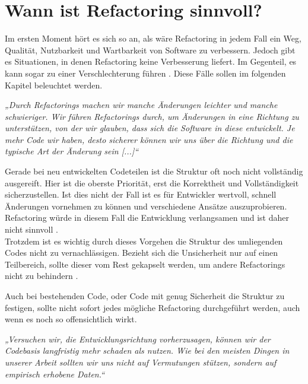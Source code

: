 \chapter{Wann ist Refactoring sinnvoll?}
Im ersten Moment hört es sich so an, als wäre Refactoring in jedem Fall ein Weg, Qualität, Nutzbarkeit und Wartbarkeit von Software zu verbessern.
Jedoch gibt es Situationen, in denen Refactoring keine Verbesserung liefert. Im Gegenteil, es kann sogar zu einer Verschlechterung führen \citep[S. 321 f.]{fiveLines.2023}.
Diese Fälle sollen im folgenden Kapitel beleuchtet werden.\\
\begin{singlespace}
\textit{„Durch Refactorings machen wir manche Änderungen leichter und manche schwieriger. Wir führen Refactorings durch, um Änderungen in eine Richtung zu unterstützen, von der wir glauben, dass sich die Software in diese entwickelt. Je mehr Code wir haben, desto sicherer können wir uns über die Richtung und die typische Art der Änderung sein [...]“}\citep[S. 321]{fiveLines.2023}\\
\end{singlespace}
\par
Gerade bei neu entwickelten Codeteilen ist die Struktur oft noch nicht vollständig ausgereift.
Hier ist die oberste Priorität, erst die Korrektheit und Vollständigkeit sicherzustellen.
Ist dies nicht der Fall ist es für Entwickler wertvoll, schnell Änderungen vornehmen zu können und verschiedene Ansätze auszuprobieren.
Refactoring würde in diesem Fall die Entwicklung verlangsamen und ist daher nicht sinnvoll \citep[S. 321]{fiveLines.2023}.\\
Trotzdem ist es wichtig durch dieses Vorgehen die Struktur des umliegenden Codes nicht zu vernachlässigen.
Bezieht sich die Unsicherheit nur auf einen Teilbereich, sollte dieser vom Rest gekapselt werden, um andere Refactorings nicht zu behindern \citep[S. 321]{fiveLines.2023}.\\
\par
Auch bei bestehenden Code, oder Code mit genug Sicherheit die Struktur zu festigen, sollte nicht sofort jedes mögliche Refactoring durchgeführt werden, auch wenn es noch so offensichtlich wirkt.\\
\begin{singlespace}
\textit{„Versuchen wir, die Entwicklungsrichtung vorherzusagen, können wir der Codebasis langfristig mehr schaden als nutzen. Wie bei den meisten Dingen in unserer Arbeit sollten wir uns nicht auf Vermutungen stützen, sondern auf empirisch erhobene Daten.“}\citep[S. 322]{fiveLines.2023}\\
\end{singlespace}

